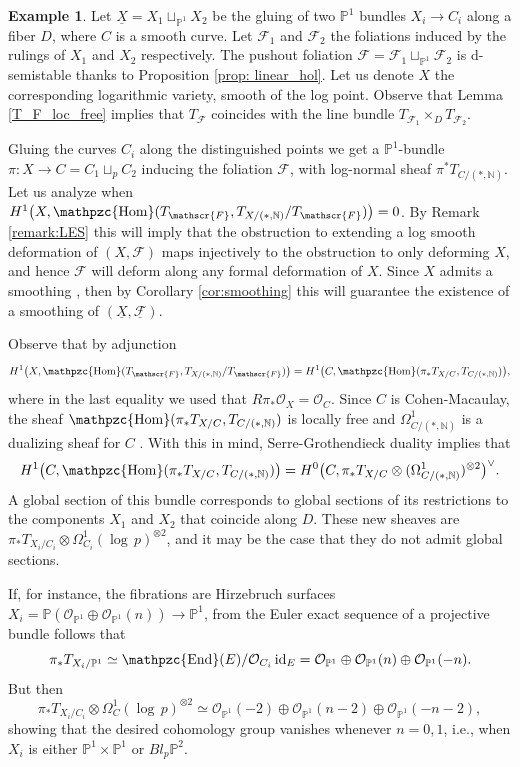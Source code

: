 \documentclass[reqno]{amsart}
\newcommand\N{\mathbb{N}}
\renewcommand\P{\mathbb{P}}
\newcommand{\OO}{\mathcal{O}}
\newcommand{\F}{\mathscr{F}}
\DeclareMathOperator{\sHom}{\mathpzc{Hom}}
\DeclareMathOperator{\sEnd}{\mathpzc{End}}
\theoremstyle{definition}
\newtheorem{example}[theorem]{Example}
\theoremstyle{named}
\begin{document}
\begin{example}    
Let $\underline{X} = X_1 \sqcup_{\P^1} X_2$ be the gluing of two $\P^1$ bundles $X_i\to C_i$ along a fiber $D$, where $C$ is a smooth curve.
Let $\F_1$ and $\F_2$ the foliations induced by the rulings of $X_1$ and $X_2$ respectively. The pushout foliation $\F = \F_1\sqcup_{\P^1} \F_2$ is d-semistable thanks to Proposition \ref{prop: linear_hol}.  Let us denote $X$ the corresponding logarithmic variety, smooth of the log point. Observe that Lemma \ref{T_F_loc_free} implies that $T_\F$ coincides with the line bundle $T_{\F_1}\times_D T_{\F_2}$.  \

Gluing the curves $C_i$ along the distinguished points we get a  $\P^1$-bundle $\pi: X\rightarrow C = C_1\sqcup_p C_2$ inducing the foliation $\F$, with log-normal sheaf $\pi^\ast T_{C/(\ast,\N)}$.
Let us analyze when $H^1\big(X,\sHom(T_\F, T_{X/(\ast,\N)}/T_\F)\big) = 0$. By Remark \ref{remark:LES} this will imply that the obstruction to extending a log smooth deformation of $(X,\F)$ maps injectively to the obstruction to only deforming $X$, and hence $\F$ will deform along any formal deformation of $X$. Since $X$ admits a smoothing \cite[Chapter V]{persson1977degenerations}, then by Corollary \ref{cor:smoothing} this will guarantee the existence of a smoothing of $(\underline{X},\underline{\F})$.

Observe that by adjunction
$$
    H^1\big(X,\sHom(T_\F, T_{X/(\ast,\N)}/T_\F)\big) = H^1\big(C,\sHom(\pi_\ast T_{X/C},T_{C/(\ast,\N)})\big),
$$
where in the last equality we used that $R\pi_\ast \OO_X = \OO_C$.  Since $C$ is Cohen-Macaulay, the sheaf $\sHom(\pi_\ast T_{X/C},T_{C/(\ast,\N)})$ is locally free and $\Omega^1_{C/(\ast,\N)}$ is a dualizing sheaf for $C$ \cite[Proposition 7.70]{felten2025global}. With this in mind, Serre-Grothendieck duality implies that
\[
 H^1\big(C,\sHom(\pi_\ast T_{X/C},T_{C/(\ast,\N)})\big) = H^0\big(C,\pi_\ast T_{X/C}\otimes (\Omega^1_{C/(\ast,\N)})^{\otimes 2}\big)^\vee.
\]
A global section of this bundle corresponds to global sections of its restrictions to the components $X_1$ and $X_2$ that coincide along $D$. These new sheaves are $\pi_*T_{X_i/C_i}\otimes \Omega^1_{C_i}(\log \,p)^{\otimes 2}$, and it may be the case that they do not admit global sections.

If, for instance, the fibrations are Hirzebruch surfaces $X_i=\P(\OO_{\P^1}\oplus \OO_{\P^1}(n))\to \P^1$, from the Euler exact sequence of a projective bundle follows that 
$$\pi_\ast T_{X_i/\P^1} \simeq \sEnd(E)/\OO_{C_i}\operatorname{id}_E = \OO_{\P^1}\oplus  \OO_{\P^1}(n) \oplus \OO_{\P^1}(-n).$$ But then 
$$\pi_*T_{X_i/C_i}\otimes \Omega^1_C(\log \,p)^{\otimes 2}\simeq \OO_{\P^1}(-2) \oplus \OO_{\P^1}(n-2)\oplus \OO_{\P^1}(-n-2),$$
showing that the desired cohomology group vanishes whenever $n=0,1$, i.e., when $X_i$ is either $\P^1\times \P^1$ or $Bl_p\P^2$. 
\end{example}
\end{document}
